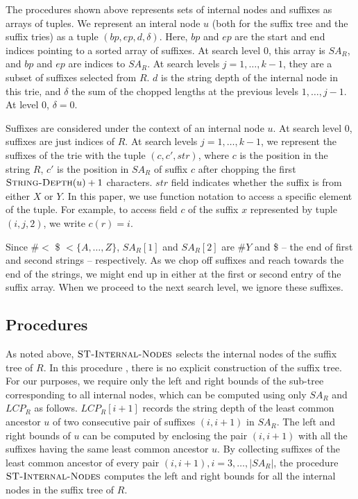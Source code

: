 \documentclass{article}
\begin{document}
The procedures shown above represents sets of internal nodes and
suffixes as arrays of tuples. We represent an interal node $u$ (both for
the suffix tree and the suffix tries) as a tuple $(bp, ep, d, \delta
)$. Here, $bp$ and $ep$ are the start and end indices pointing to a
sorted array of suffixes. At search level $0$, this array is $SA_R$, and
$bp$ and $ep$ are indices to $SA_R$. At search levels $j =
1,\ldots,k-1$, they are a subset of suffixes selected from $R$. $d$ is
the string depth of the internal node in this trie, and $\delta$ the sum
of the chopped lengths at the previous levels $1, \ldots, j-1$. At level
$0$, $\delta = 0$.

Suffixes are considered under the context of an internal node $u$. At
search level $0$, suffixes are just indices of $R$. At search levels $j
= 1,\ldots,k-1$, we represent the suffixes of the trie with the tuple
$(c, c', str)$, where $c$ is the position in the string $R$, $c'$ is the
position in $SA_R$ of suffix $c$ after chopping the first
$\textnormal{\scshape String-Depth}(u) + 1$ characters. $str$ field indicates whether
the suffix is from either $X$ or $Y$. In this paper, we use function
notation to access a specific element of the tuple. For example, to
access field $c$ of the suffix $x$ represented by tuple $(i, j, 2)$,
we write $c(r) = i$.

Since $\# <$ \$ $< \{A,\ldots, Z\}$, $SA_R[1]$ and $SA_R[2]$ are $\#Y$
and \$ -- the end of first and second strings -- respectively.
As we chop off suffixes and reach towards the end of the strings, we
might end up in either at the first or second entry of the suffix
array. When we proceed to the next search level, we ignore these suffixes.

\subsection{Procedures}

As noted above, $\textnormal{\scshape ST-Internal-Nodes}$ selects the internal nodes of
the suffix tree of $R$. In this procedure , there is no explicit
construction of the suffix tree. For our purposes, we require only the
left and right bounds of the sub-tree corresponding to all internal
nodes, which can be computed using only $SA_R$ and $LCP_R$ as
follows. $LCP_R[i+1]$ records the string depth of the least common
ancestor $u$ of two consecutive pair of suffixes $(i, i+1)$ in
$SA_R$. The left and right bounds of $u$ can be computed by enclosing
the pair $(i, i+1)$ with all the suffixes having the same least common
ancestor $u$. By collecting suffixes of the least common ancestor of
every pair $(i, i+1), i = 3, \ldots, |SA_R|$, the procedure
$\textnormal{\scshape ST-Internal-Nodes}$ computes the left and right bounds for all
the internal nodes in the suffix tree of $R$.
\end{document}
